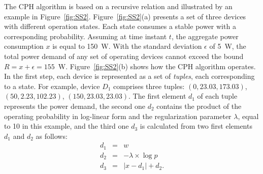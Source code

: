 
The CPH algorithm is based on a recursive relation  and illustrated by an example in Figure~\ref{fig:SS2}. Figure~\ref{fig:SS2}(a) presents a set of three devices with different operation states. Each state consumes a stable power with a corresponding probability. Assuming at time instant $t$, the aggregate power consumption $x$ is equal to 150~W. With the standard deviation $\epsilon$ of 5~W, the total power demand of any set of operating devices cannot exceed the bound $R=x +\epsilon = 155$~W. Figure~\ref{fig:SS2}(b) shows how the CPH algorithm operates. In the first step, each device is represented as a set of \textit{tuples}, each corresponding to a state. For example, device $D_1$ comprises three tuples: $(0, 23.03,173.03)$, $(50,2.23,102.23)$, $(150,23.03,23.03)$. The first element $d_1$ of each tuple represents the power demand, the second one $d_2$ contains the product of the operating probability in log-linear form and the regularization parameter $\lambda$, equal to 10 in this example, and the third one $d_3$ is calculated from two first elements $d_1$ and $d_2$ as follows:
\begin{eqnarray}
d_1 &=& w\\
d_2 &=& -\lambda \times \log{p}\\
d_3 &=& \left|x-d_1\right|+d_2. \label{eqCPH1}
\end{eqnarray}
